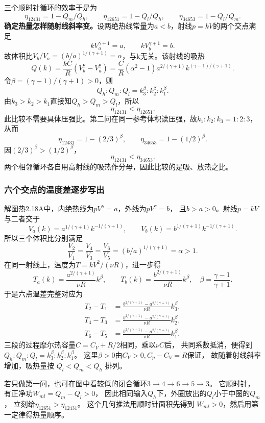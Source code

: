 \documentclass[UTF8,fontset=fandol,a4paper,11pt]{ctexart}
\newcommand{\result}[1]{\begin{equation*}\boxed{#1}\end{equation*}}
\begin{document}
三个顺时针循环的效率于是为
\[\eta_{12431}=1-Q_m/Q_h,\qquad
\eta_{12651}=1-Q_l/Q_h,\qquad
\eta_{34653}=1-Q_l/Q_m.\]
\textbf{确定热量怎样随射线斜率变。}设两绝热线常量为$a<b$，射线$p=kV$的两个交点满足
\[kV_a^{\gamma+1}=a,\qquad kV_b^{\gamma+1}=b.\]
故体积比$V_b/V_a=(b/a)^{1/(\gamma+1)}=\alpha$，与k无关。该射线的吸热
\[Q(k)=\frac{kC}{R}(V_b^2-V_a^2)
=\frac{C}{R}(\alpha^2-1)a^{2/(\gamma+1)}k^{(\gamma-1)/(\gamma+1)}.\]
令$\beta=(\gamma-1)/(\gamma+1)>0$，则
\[Q_h:Q_m:Q_l=k_3^\beta:k_2^\beta:k_1^\beta.\]
由$k_3>k_2>k_1$直接知$Q_h>Q_m>Q_l$，所以
\result{\eta_{12431}<\eta_{12651}.}
此比较不需要具体压强比。第二问在同一参考体积读压强，故$k_1:k_2:k_3=1:2:3$，从而
\[\eta_{12431}=1-(2/3)^\beta,\qquad
\eta_{34653}=1-(1/2)^\beta.\]
因$(2/3)^\beta>(1/2)^\beta$，
\result{\eta_{12431}<\eta_{34653}.}
两个相邻循环各自用高射线的吸热作分母，因此比较的是吸、放热之比。
\subsubsection*{六个交点的温度差逐步写出}
解图热2.18A中，内绝热线为$pV^\gamma=a$，外线为$pV^\gamma=b$，
且$b>a>0$。射线$p=kV$与二者交于
\[
V_a(k)=a^{1/(\gamma+1)}k^{-1/(\gamma+1)},\qquad
V_b(k)=b^{1/(\gamma+1)}k^{-1/(\gamma+1)}.
\]
所以三个体积比分别满足
\[
\frac{V_2}{V_1}=\frac{V_4}{V_3}=\frac{V_6}{V_5}
=(b/a)^{1/(\gamma+1)}=\alpha>1.
\]
在同一射线上，温度为$T=kV^2/(\nu R)$，进一步得
\[
T_a(k)=\frac{a^{2/(\gamma+1)}}{\nu R}k^\beta,\qquad
T_b(k)=\frac{b^{2/(\gamma+1)}}{\nu R}k^\beta,
\quad \beta=\frac{\gamma-1}{\gamma+1}.
\]
于是六点温差完整对应为
\[
\begin{aligned}
T_2-T_1&=\frac{b^{2/(\gamma+1)}-a^{2/(\gamma+1)}}{\nu R}k_3^\beta,\\
T_4-T_3&=\frac{b^{2/(\gamma+1)}-a^{2/(\gamma+1)}}{\nu R}k_2^\beta,\\
T_6-T_5&=\frac{b^{2/(\gamma+1)}-a^{2/(\gamma+1)}}{\nu R}k_1^\beta.
\end{aligned}
\]
三段的过程摩尔热容量$C=C_V+R/2$相同，乘以$\nu C$后，
共同系数抵消，便得到$Q_h:Q_m:Q_l=k_3^\beta:k_2^\beta:k_1^\beta$。
这里$\beta>0$由$C_V>0,C_p-C_V=R$保证，
故随着射线斜率增加，吸热量按 $Q_l<Q_m<Q_h$ 排列。

若只做第一问，也可在图中看较低的闭合循环$3\to4\to6\to5\to3$。
它顺时针，有正净功$W_{ml}=Q_m-Q_l>0$，
因此相同输入$Q_h$下，外圈放出的$Q_l$小于中圈的$Q_m$，
立刻给$\eta_{12651}>\eta_{12431}$。
这个几何推法用顺时针面积先得到 $W_{ml}>0$，然后用第一定律得热量顺序。
\end{document}
